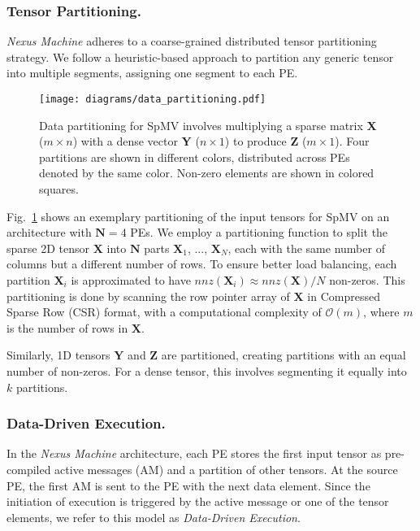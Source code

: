 \subsubsection{Tensor Partitioning.}
\label{section:data_placement}
\textit{Nexus Machine} adheres to a coarse-grained distributed tensor partitioning strategy.
We follow a heuristic-based approach to partition any generic tensor into multiple segments, assigning one segment to each PE.
\begin{figure}[t!]
	\scriptsize
	\centering	\texttt{[image: diagrams/data\_partitioning.pdf]}
    \vspace{-0.25cm}
    \caption{Data partitioning for SpMV involves multiplying a sparse matrix \textbf{X} ($m \times n$) with a dense vector \textbf{Y} ($n \times 1$) to produce \textbf{Z} ($m \times 1$). Four partitions are shown in different colors, distributed across PEs denoted by the same color. Non-zero elements are shown in colored squares.}
	\label{fig:data_partitioning}
\end{figure}

Fig.~\ref{fig:data_partitioning} shows an exemplary partitioning of the input tensors for SpMV on an architecture with $\textbf{N}=4$ PEs.
We employ a partitioning function to split the sparse 2D tensor $\textbf{X}$ into $\textbf{N}$ parts $\textbf{X}_1$, ..., $\textbf{X}_N$, each with the same number of columns but a different number of rows. To ensure better load balancing, each partition $\textbf{X}_i$ is approximated to have $nnz(\textbf{X}_i) \approx nnz(\textbf{X})/N$ non-zeros. This partitioning is done by scanning the row pointer array of $\textbf{X}$ in Compressed Sparse Row (CSR) format, with a computational complexity of $\mathcal{O}(m)$, where $m$ is the number of rows in $\textbf{X}$.

Similarly, 1D tensors $\textbf{Y}$ and $\textbf{Z}$ are partitioned, creating partitions with an equal number of non-zeros. For a dense tensor, this involves segmenting it equally into $k$ partitions.

\subsubsection{Data-Driven Execution.}
In the \textit{Nexus Machine} architecture, each PE stores the first input tensor as pre-compiled active messages (AM) and a partition of other tensors. At the source PE, the first AM is sent to the PE with the next data element. Since the initiation of execution is triggered by the active message or one of the tensor elements, we refer to this model as \textit{Data-Driven Execution}. 

